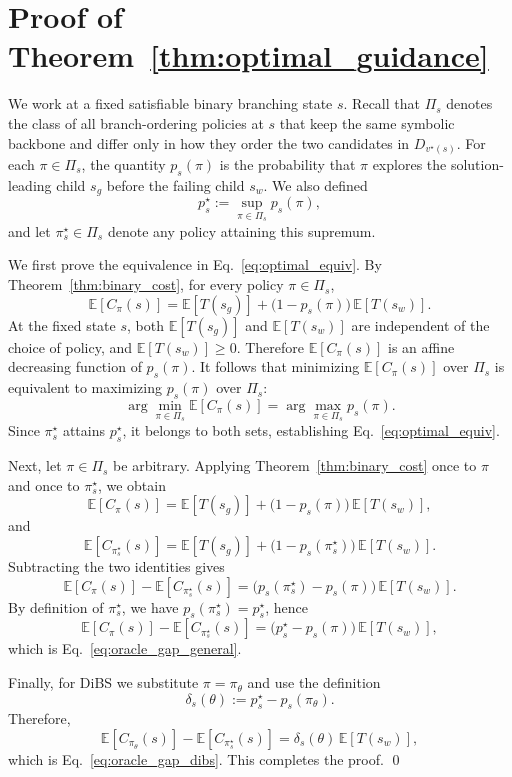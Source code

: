 \documentclass[lettersize,journal]{IEEEtran}
\begin{document}
\section{Proof of Theorem~\ref{thm:optimal_guidance}}
\label{sec:proof_optimal_guidance}

We work at a fixed satisfiable binary branching state $s$.
Recall that $\Pi_s$ denotes the class of all branch-ordering policies at $s$ that keep the same symbolic
backbone and differ only in how they order the two candidates in $D_{v^\star(s)}$.
For each $\pi\in\Pi_s$, the quantity $p_s(\pi)$ is the probability that $\pi$ explores the
solution-leading child $s_g$ before the failing child $s_w$.
We also defined
\[
p_s^\star := \sup_{\pi\in\Pi_s} p_s(\pi),
\]
and let $\pi_s^\star\in\Pi_s$ denote any policy attaining this supremum.

We first prove the equivalence in Eq.~\eqref{eq:optimal_equiv}.
By Theorem~\ref{thm:binary_cost}, for every policy $\pi\in\Pi_s$,
\[
\mathbb{E}[C_\pi(s)]
=
\mathbb{E}[T(s_g)]
+
\bigl(1-p_s(\pi)\bigr)\,\mathbb{E}[T(s_w)].
\]
At the fixed state $s$, both $\mathbb{E}[T(s_g)]$ and $\mathbb{E}[T(s_w)]$ are independent of the
choice of policy, and $\mathbb{E}[T(s_w)]\ge 0$.
Therefore $\mathbb{E}[C_\pi(s)]$ is an affine decreasing function of $p_s(\pi)$.
It follows that minimizing $\mathbb{E}[C_\pi(s)]$ over $\Pi_s$ is equivalent to maximizing $p_s(\pi)$ over $\Pi_s$:
\[
\arg\min_{\pi\in\Pi_s}\mathbb{E}[C_\pi(s)]
=
\arg\max_{\pi\in\Pi_s} p_s(\pi).
\]
Since $\pi_s^\star$ attains $p_s^\star$, it belongs to both sets, establishing Eq.~\eqref{eq:optimal_equiv}.

Next, let $\pi\in\Pi_s$ be arbitrary.
Applying Theorem~\ref{thm:binary_cost} once to $\pi$ and once to $\pi_s^\star$, we obtain
\[
\mathbb{E}[C_\pi(s)]
=
\mathbb{E}[T(s_g)]
+
\bigl(1-p_s(\pi)\bigr)\,\mathbb{E}[T(s_w)],
\]
and
\[
\mathbb{E}[C_{\pi_s^\star}(s)]
=
\mathbb{E}[T(s_g)]
+
\bigl(1-p_s(\pi_s^\star)\bigr)\,\mathbb{E}[T(s_w)].
\]
Subtracting the two identities gives
\[
\mathbb{E}[C_\pi(s)]-\mathbb{E}[C_{\pi_s^\star}(s)]
=
\bigl(p_s(\pi_s^\star)-p_s(\pi)\bigr)\,\mathbb{E}[T(s_w)].
\]
By definition of $\pi_s^\star$, we have $p_s(\pi_s^\star)=p_s^\star$, hence
\[
\mathbb{E}[C_\pi(s)]-\mathbb{E}[C_{\pi_s^\star}(s)]
=
\bigl(p_s^\star-p_s(\pi)\bigr)\,\mathbb{E}[T(s_w)],
\]
which is Eq.~\eqref{eq:oracle_gap_general}.

Finally, for DiBS we substitute $\pi=\pi_\theta$ and use the definition
\[
\delta_s(\theta):=p_s^\star-p_s(\pi_\theta).
\]
Therefore,
\[
\mathbb{E}[C_{\pi_\theta}(s)]-\mathbb{E}[C_{\pi_s^\star}(s)]
=
\delta_s(\theta)\,\mathbb{E}[T(s_w)],
\]
which is Eq.~\eqref{eq:oracle_gap_dibs}.
This completes the proof.
\qed
\end{document}
